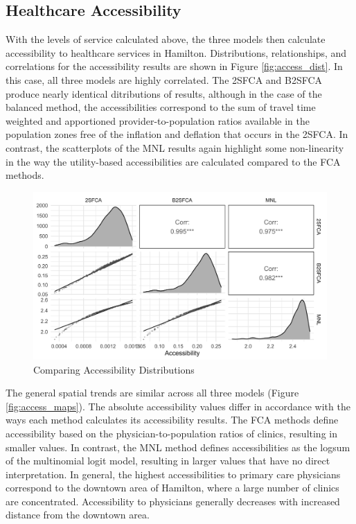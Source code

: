 \documentclass{article}
\begin{document}
\hypertarget{healthcare-accessibility}{%
\subsection{Healthcare Accessibility}\label{healthcare-accessibility}}

With the levels of service calculated above, the three models then
calculate accessibility to healthcare services in Hamilton.
Distributions, relationships, and correlations for the accessibility
results are shown in Figure \ref{fig:access_dist}. In this case, all
three models are highly correlated. The 2SFCA and B2SFCA produce nearly
identical ditributions of results, although in the case of the balanced
method, the accessibilities correspond to the sum of travel time
weighted and apportioned provider-to-population ratios available in the
population zones free of the inflation and deflation that occurs in the
2SFCA. In contrast, the scatterplots of the MNL results again highlight
some non-linearity in the way the utility-based accessibilities are
calculated compared to the FCA methods.

\begin{figure}
\includegraphics[width=1\linewidth]{./img/pair_plot_access} \caption{\label{fig:access_dist}Comparing Accessibility Distributions}\label{fig:access_dist_fig}
\end{figure}

The general spatial trends are similar across all three models (Figure
\ref{fig:access_maps}). The absolute accessibility values differ in
accordance with the ways each method calculates its accessibility
results. The FCA methods define accessibility based on the
physician-to-population ratios of clinics, resulting in smaller values.
In contrast, the MNL method defines accessibilities as the logsum of the
multinomial logit model, resulting in larger values that have no direct
interpretation. In general, the highest accessibilities to primary care
physicians correspond to the downtown area of Hamilton, where a large
number of clinics are concentrated. Accessibility to physicians
generally decreases with increased distance from the downtown area.
\end{document}
